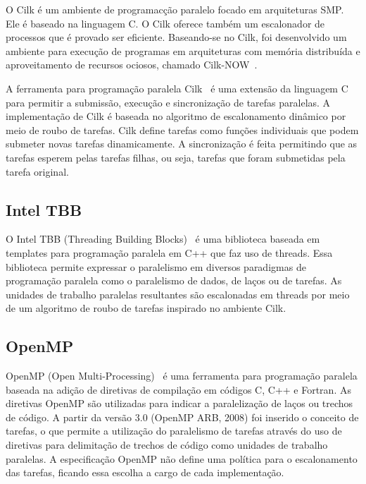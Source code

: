O Cilk é um ambiente de programacção paralelo focado em arquiteturas SMP. Ele  é baseado na linguagem C. O Cilk oferece também um escalonador de processos que é provado ser eficiente. Baseando-se no Cilk, foi desenvolvido um ambiente para execução de programas em arquiteturas com memória distribuída e aproveitamento de recursos ociosos, chamado Cilk-NOW~\cite{Blumofe:1997:ARP:1268680.1268690}.


A ferramenta para programação paralela Cilk~\cite{Blumofe:1995:CEM:209936.209958, Blumofe:1997:ARP:1268680.1268690} é uma extensão da linguagem C para permitir a submissão, execução e sincronização de tarefas paralelas. A implementação de Cilk é baseada no algoritmo de escalonamento dinâmico por meio de roubo de tarefas. Cilk define tarefas como funções individuais que podem submeter novas tarefas dinamicamente. A sincronização é feita permitindo que as tarefas esperem pelas tarefas filhas, ou seja, tarefas que foram submetidas pela tarefa original.


\subsection{Intel TBB}

O Intel TBB (Threading Building Blocks)~\cite{Kim:2011:MDP:1920042.1920078} é uma biblioteca baseada em templates para programação paralela em C++ que faz uso de threads. Essa biblioteca permite expressar o paralelismo em diversos paradigmas de programação paralela como o paralelismo de dados, de laços ou de tarefas. As unidades de trabalho paralelas resultantes são escalonadas em threads por meio de um algoritmo de roubo de tarefas inspirado no ambiente Cilk.

\subsection{OpenMP}

OpenMP (Open Multi-Processing)~\cite{Quinn:2003:PPC:1211440} é uma ferramenta para programação paralela baseada na adição de diretivas de compilação em códigos C, C++ e Fortran. As diretivas OpenMP são utilizadas para indicar a paralelização de laços ou trechos de código. A partir da versão 3.0 (OpenMP ARB, 2008) foi inserido o conceito de tarefas, o que permite a utilização do paralelismo de tarefas através do uso de diretivas para delimitação de trechos de código como unidades de trabalho paralelas. A especificação OpenMP não define uma política para o escalonamento das tarefas, ficando essa escolha a cargo de cada implementação.
